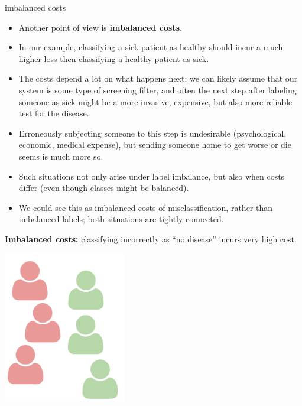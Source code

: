 \documentclass[11pt,compress,t,notes=noshow, xcolor=table]{beamer}
\begin{document}
\begin{vbframe}{imbalanced costs}
 
\begin{itemize}
  \item Another point of view is \textbf{imbalanced costs}.
  \item In our example, classifying a sick patient as healthy should incur a 
  much higher loss then classifying a healthy patient as sick.
  \item The costs depend a lot on what happens next: we can likely assume that 
  our system is some type of screening filter, and often the next step after 
  labeling someone as sick might be a more invasive, expensive, but also  more 
  reliable test for the disease.
  \item Erroneously subjecting someone to this step is undesirable 
  (psychological, economic, medical expense), but sending someone home to get 
  worse or die seems is much more so.
  \item Such situations not only arise under label imbalance, but also when 
  costs differ (even though classes might be balanced).
  \item We could see this as imbalanced costs of misclassification, rather than 
  imbalanced labels; both situations are tightly connected.
\end{itemize}

\framebreak

\lz

\begin{minipage}[c]{0.65\textwidth}
  \raggedright
  \textbf{Imbalanced costs: } classifying incorrectly as \enquote{no disease} 
  incurs very high cost.
\end{minipage}%
\begin{minipage}[c]{0.35\textwidth}
  \centering
  \includegraphics[trim = 0 0 0 10, clip, width=0.4\textwidth]
  {figure_man/imbalanced-costs.pdf}
\end{minipage}


\end{vbframe}
\end{document}
